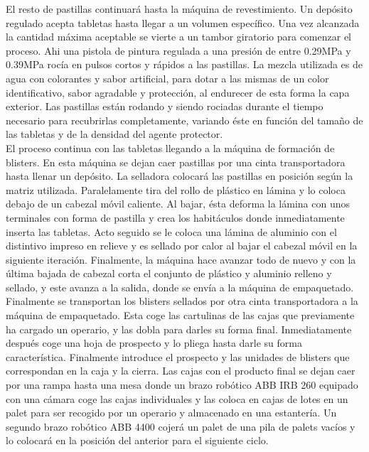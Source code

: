 El resto de pastillas continuará hasta la máquina de revestimiento. Un depósito regulado acepta tabletas hasta llegar a un volumen específico. Una vez alcanzada la cantidad máxima aceptable se vierte a un tambor giratorio para comenzar el proceso. Ahi una pistola de pintura regulada a una presión de entre 0.29MPa y 0.39MPa rocía en pulsos cortos y rápidos a las pastillas. La mezcla utilizada es de agua con colorantes y sabor artificial, para dotar a las mismas de un color identificativo, sabor agradable y protección, al endurecer de esta forma la capa exterior. Las pastillas están rodando y siendo rociadas durante el tiempo necesario para recubrirlas completamente, variando éste en función del tamaño de las tabletas y de la densidad del agente protector.\\

El proceso continua con las tabletas llegando a la máquina de formación de blisters. En esta máquina se dejan caer pastillas por una cinta transportadora hasta llenar un depósito. La selladora colocará las pastillas en posición según la matriz utilizada. Paralelamente tira del rollo de plástico en lámina y lo coloca debajo de un cabezal móvil caliente. Al bajar, ésta deforma la lámina con unos terminales con forma de pastilla y crea los habitáculos donde inmediatamente inserta las tabletas. Acto seguido se le coloca una lámina de aluminio con el distintivo impreso en relieve y es sellado por calor al bajar el cabezal móvil en la siguiente iteración. Finalmente, la máquina hace avanzar todo de nuevo y con la última bajada de cabezal corta el conjunto de plástico y aluminio relleno y sellado, y este avanza a la salida, donde se  envía a la máquina de empaquetado.\\

Finalmente se transportan los blisters sellados por otra cinta transportadora a la máquina de empaquetado. Esta coge las cartulinas de las cajas que previamente ha cargado un operario, y las dobla para darles su forma final. Inmediatamente después coge una hoja de prospecto y lo pliega hasta darle su forma característica. Finalmente introduce el prospecto y las unidades de blisters que correspondan en la caja y la cierra. Las cajas con el producto final se dejan caer por una rampa hasta una mesa donde un brazo robótico ABB IRB 260 equipado con una cámara coge las cajas individuales y las coloca en cajas de lotes en un palet para ser recogido por un operario y almacenado en una estantería. Un segundo brazo robótico ABB 4400 cojerá un palet de una pila de palets vacíos y lo colocará en la posición del anterior para el siguiente ciclo.
\\

